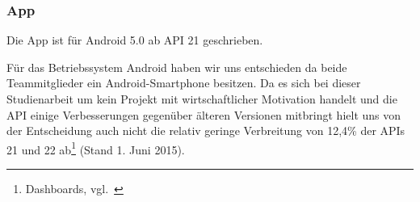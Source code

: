 \subsubsection{App}
Die App ist für Android 5.0 ab API 21 geschrieben. 

Für das Betriebssystem Android haben wir uns entschieden da beide Teammitglieder ein Android-Smartphone besitzen. Da es sich bei dieser Studienarbeit um kein Projekt mit wirtschaftlicher Motivation handelt und die API einige Verbesserungen gegenüber älteren Versionen mitbringt hielt uns von der Entscheidung auch nicht die relativ geringe Verbreitung von 12,4\% der APIs 21 und 22 ab\footnote{Dashboards, vgl.~\cite{verbreitung}} (Stand 1. Juni 2015).